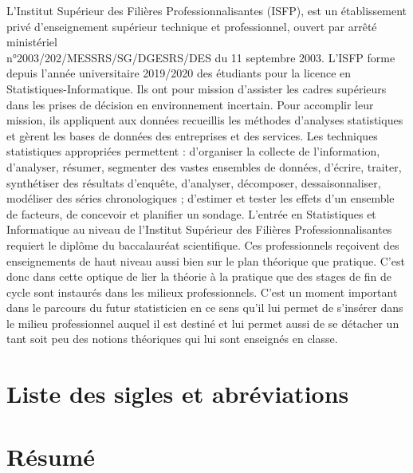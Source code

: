 \documentclass[12pt,a4paper]{report}
\begin{document}
	
	L’Institut Supérieur des Filières Professionnalisantes (ISFP), est un établissement privé d’enseignement supérieur technique et professionnel, ouvert par arrêté ministériel\\ n°2003/202/MESSRS/SG/DGESRS/DES du 11 septembre 2003.
	L'ISFP forme depuis l’année universitaire 2019/2020 des étudiants pour la licence en Statistiques-Informatique. Ils ont pour mission d’assister les cadres supérieurs dans les prises de décision en environnement incertain. Pour accomplir leur mission, ils appliquent aux données recueillis les méthodes d’analyses statistiques et gèrent les bases de données des entreprises et des services. Les techniques statistiques appropriées permettent : d’organiser la collecte de l’information, d’analyser, résumer,
	segmenter des vastes ensembles de données, d’écrire, traiter, synthétiser des résultats d’enquête, d’analyser, décomposer, dessaisonnaliser, modéliser des séries chronologiques ; d’estimer
	et tester les effets d’un ensemble de facteurs, de concevoir et planifier un sondage. L’entrée en
	Statistiques et Informatique au niveau de l’Institut Supérieur des Filières Professionnalisantes
	requiert le diplôme du baccalauréat scientifique. Ces professionnels reçoivent des enseignements
	de haut niveau aussi bien sur le plan théorique que pratique. C’est donc dans cette optique
	de lier la théorie à la pratique que des stages de fin de cycle sont instaurés dans les milieux
	professionnels. C’est un moment important dans le parcours du futur statisticien en ce sens
	qu’il lui permet de s’insérer dans le milieu professionnel auquel il est destiné et lui permet aussi
	de se détacher un tant soit peu des notions théoriques qui lui sont enseignés en classe.
	
	
	\newpage
	
	
	\chapter*{Liste des sigles et abréviations}       %
	
	
	\vspace*{1cm}
	\newpage
	
	\chapter*{Résumé}       %
	\vspace*{1cm}
	\newpage
	
\end{document}
